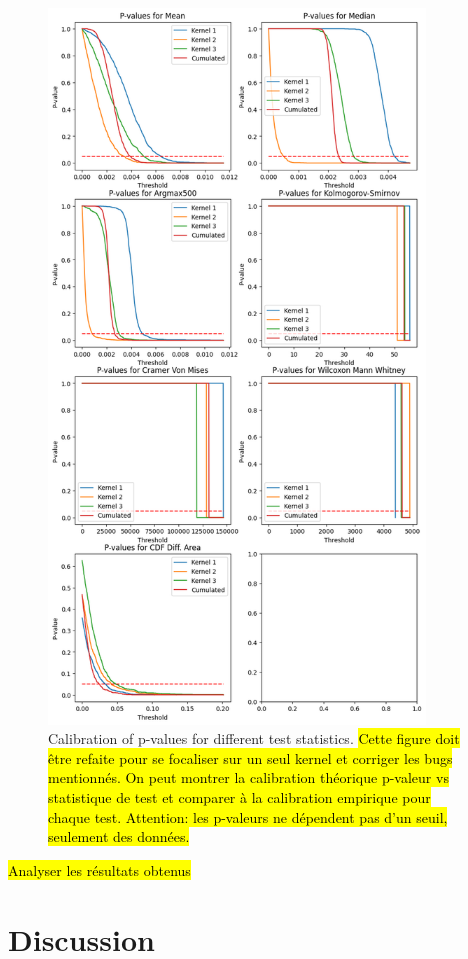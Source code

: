 \documentclass{article}
\begin{document}
\begin{figure}[H]
\centering
\includegraphics[width=10cm]{img/p-values.png}
\caption{Calibration of p-values for different test statistics. \hl{Cette figure doit être refaite pour se focaliser sur un seul kernel et corriger les bugs mentionnés. On peut montrer la calibration théorique p-valeur vs statistique de test et comparer à la calibration empirique pour chaque test. Attention: les p-valeurs ne dépendent pas d'un seuil, seulement des données.}}
\label{fig:pvalues}
\end{figure}

\hl{Analyser les résultats obtenus}


\section{Discussion}
\end{document}
